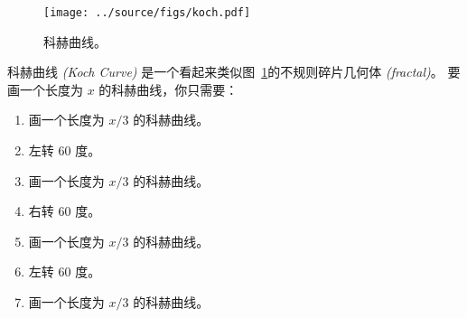 {{{{\begin{exercise}
\end{exercise}


\begin{figure}
\centerline
{\texttt{[image: ../source/figs/koch.pdf]}}
\caption{科赫曲线。}
\label{fig.koch}
\end{figure}


\begin{exercise}


科赫曲线 {\em (Koch Curve)} 是一个看起来类似图~\ref{fig.koch}的不规则碎片几何体 {\em (fractal)}。 要画一个长度为 $x$ 的科赫曲线，你只需要：


\begin{enumerate}

\item 画一个长度为 $x/3$ 的科赫曲线。

\item 左转 $60$ 度。

\item 画一个长度为 $x/3$ 的科赫曲线。

\item 右转 $60$ 度。

\item 画一个长度为 $x/3$ 的科赫曲线。

\item 左转 $60$ 度。

\item 画一个长度为 $x/3$ 的科赫曲线。

\end{enumerate}



\end{exercise}}}}}
